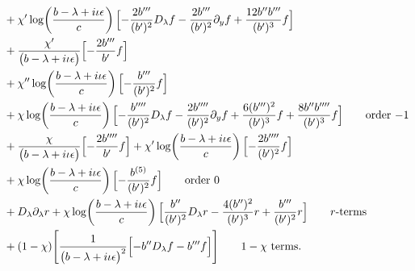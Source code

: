 \documentclass[reqno,11pt]{amsart}
\numberwithin{equation}{section}
\newcommand{\p}{\partial}
\newcommand{\D}{D_\lambda}
\numberwithin{equation}{section} %
\begin{document}
\begin{enumerate}
\begin{align}
&+\chi'\log\!\left(\frac{b -\lambda+i\iota\epsilon}{c}\right)\Bigl[- \frac{2 b''' }{(b' )^{2}} \D f- \frac{2 b''' }{(b' )^{2}} \p_y f+\frac{12 b''  b''' }{(b' )^{3}} f\Bigr]\notag\\
&+\frac{\chi'}{\bigl(b -\lambda+i\iota\epsilon\bigr)}\Bigl[- \frac{2 b''' }{b' } f\Bigr]\notag\\
&+\chi''\log\!\left(\frac{b -\lambda+i\iota\epsilon}{c}\right)\Bigl[- \frac{b''' }{(b' )^{2}} f\Bigr]\notag\\
&+\chi\log\!\left(\frac{b -\lambda+i\iota\epsilon}{c}\right)\Bigl[- \frac{b'''' }{(b' )^{2}} \D f- \frac{2 b'''' }{(b' )^{2}} \p_y f+\frac{6 (b''' )^{2}}{(b' )^{3}} f+\frac{8 b''  b'''' }{(b' )^{3}} f\Bigr]\tag*{\text{order $-1$}}\\
&+\frac{\chi}{\bigl(b -\lambda+i\iota\epsilon\bigr)}\Bigl[- \frac{2 b'''' }{b' } f\Bigr]+\chi'\log\!\left(\frac{b -\lambda+i\iota\epsilon}{c}\right)\Bigl[- \frac{2 b'''' }{(b' )^{2}} f\Bigr]\notag\\
&+\chi\log\!\left(\frac{b -\lambda+i\iota\epsilon}{c}\right)\Bigl[- \frac{b^{(5)} }{(b' )^{2}} f\Bigr]\tag*{\text{order $0$}}\\
&+\D\p_\lambda r+\chi\log\!\left(\frac{b -\lambda+i\iota\epsilon}{c}\right)\Bigl[\frac{b'' }{(b' )^{2}} \D r- \frac{4 (b'' )^{2}}{(b' )^{3}} r+\frac{b''' }{(b' )^{2}} r\Bigr]\tag*{\text{$r$-terms}}\\
&+(1-\chi)\Bigg[\frac{1}{\bigl(b -\lambda+i\iota\epsilon\bigr)^{2}}\Bigl[- b''  \D f- b'''  f\Bigr]\Bigg]\tag*{\text{$1-\chi$ terms}}.\\
&
\end{align}


\end{enumerate}
\end{document}
